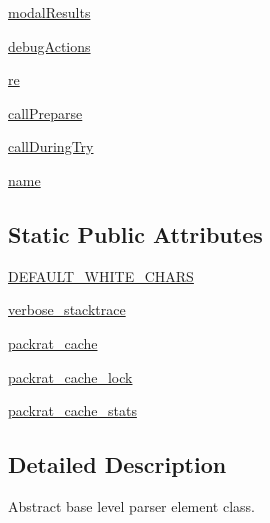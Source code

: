 \begin{DoxyCompactItemize}
\item 
\hyperlink{classpip_1_1__vendor_1_1pyparsing_1_1ParserElement_a0c11d89e6f83b27ce0dfd030102be618}{modal\+Results}
\item 
\hyperlink{classpip_1_1__vendor_1_1pyparsing_1_1ParserElement_a527a9ed851fbc1eaa05841215ff57619}{debug\+Actions}
\item 
\hyperlink{classpip_1_1__vendor_1_1pyparsing_1_1ParserElement_a0e79320b523945382d904fe0eb0c3840}{re}
\item 
\hyperlink{classpip_1_1__vendor_1_1pyparsing_1_1ParserElement_a87ca377d22722698c153ffa6ce7c0a52}{call\+Preparse}
\item 
\hyperlink{classpip_1_1__vendor_1_1pyparsing_1_1ParserElement_a30e3814825e98b3148e55b5eb0892f97}{call\+During\+Try}
\item 
\hyperlink{classpip_1_1__vendor_1_1pyparsing_1_1ParserElement_a91b7a89a29c2aa6e205a57aad16c8412}{name}
\end{DoxyCompactItemize}
\subsection*{Static Public Attributes}
\begin{DoxyCompactItemize}
\item 
\hyperlink{classpip_1_1__vendor_1_1pyparsing_1_1ParserElement_acbaceff02779b822a9a5b573a1f8db51}{D\+E\+F\+A\+U\+L\+T\+\_\+\+W\+H\+I\+T\+E\+\_\+\+C\+H\+A\+RS}
\item 
\hyperlink{classpip_1_1__vendor_1_1pyparsing_1_1ParserElement_a4af1fb7e9547e79920206104be6afd6c}{verbose\+\_\+stacktrace}
\item 
\hyperlink{classpip_1_1__vendor_1_1pyparsing_1_1ParserElement_a13fa705047007522bd4b3f63d6a1bee8}{packrat\+\_\+cache}
\item 
\hyperlink{classpip_1_1__vendor_1_1pyparsing_1_1ParserElement_af300af91555d56e53c0a884d4d7e97bc}{packrat\+\_\+cache\+\_\+lock}
\item 
\hyperlink{classpip_1_1__vendor_1_1pyparsing_1_1ParserElement_ac69d3a0a2b22268b59fbb05b6ed0693c}{packrat\+\_\+cache\+\_\+stats}
\end{DoxyCompactItemize}


\subsection{Detailed Description}
\begin{DoxyVerb}Abstract base level parser element class.\end{DoxyVerb}
 

